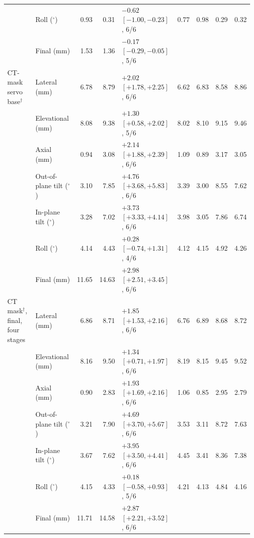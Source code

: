 \begin{table}[tbp]
\begin{tabular}{@{}l l rr l rr rr@{}}
 & Roll ($^{\circ}$) & 0.93 & 0.31 & $-0.62$ $[-1.00, -0.23]$, 6/6 & 0.77 & 0.98 & 0.29 & 0.32 \\
 & Final (mm) & 1.53 & 1.36 & $-0.17$ $[-0.29, -0.05]$, 5/6 & & & & \\
\addlinespace[2pt]
CT-mask servo base$^{\dagger}$ & Lateral (mm) & 6.78 & 8.79 & $+2.02$ $[+1.78, +2.25]$, 6/6 & 6.62 & 6.83 & 8.58 & 8.86 \\
 & Elevational (mm) & 8.08 & 9.38 & $+1.30$ $[+0.58, +2.02]$, 5/6 & 8.02 & 8.10 & 9.15 & 9.46 \\
 & Axial (mm) & 0.94 & 3.08 & $+2.14$ $[+1.88, +2.39]$, 6/6 & 1.09 & 0.89 & 3.17 & 3.05 \\
 & Out-of-plane tilt ($^{\circ}$) & 3.10 & 7.85 & $+4.76$ $[+3.68, +5.83]$, 6/6 & 3.39 & 3.00 & 8.55 & 7.62 \\
 & In-plane tilt ($^{\circ}$) & 3.28 & 7.02 & $+3.73$ $[+3.33, +4.14]$, 6/6 & 3.98 & 3.05 & 7.86 & 6.74 \\
 & Roll ($^{\circ}$) & 4.14 & 4.43 & $+0.28$ $[-0.74, +1.31]$, 4/6 & 4.12 & 4.15 & 4.92 & 4.26 \\
 & Final (mm) & 11.65 & 14.63 & $+2.98$ $[+2.51, +3.45]$, 6/6 & & & & \\
\addlinespace[2pt]
CT mask$^{\dagger}$, final, four stages & Lateral (mm) & 6.86 & 8.71 & $+1.85$ $[+1.53, +2.16]$, 6/6 & 6.76 & 6.89 & 8.68 & 8.72 \\
 & Elevational (mm) & 8.16 & 9.50 & $+1.34$ $[+0.71, +1.97]$, 6/6 & 8.19 & 8.15 & 9.45 & 9.52 \\
 & Axial (mm) & 0.90 & 2.83 & $+1.93$ $[+1.69, +2.16]$, 6/6 & 1.06 & 0.85 & 2.95 & 2.79 \\
 & Out-of-plane tilt ($^{\circ}$) & 3.21 & 7.90 & $+4.69$ $[+3.70, +5.67]$, 6/6 & 3.53 & 3.11 & 8.72 & 7.63 \\
 & In-plane tilt ($^{\circ}$) & 3.67 & 7.62 & $+3.95$ $[+3.50, +4.41]$, 6/6 & 4.45 & 3.41 & 8.36 & 7.38 \\
 & Roll ($^{\circ}$) & 4.15 & 4.33 & $+0.18$ $[-0.58, +0.93]$, 5/6 & 4.21 & 4.13 & 4.84 & 4.16 \\
 & Final (mm) & 11.71 & 14.58 & $+2.87$ $[+2.21, +3.52]$, 6/6 & & & & \\
\bottomrule
\end{tabular}
\end{table}
